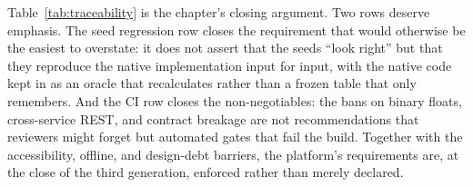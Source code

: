 Table~\ref{tab:traceability} is the chapter's closing argument. Two rows deserve emphasis. The seed
regression row closes the requirement that would otherwise be the easiest to overstate: it does not
assert that the seeds \enquote{look right} but that they reproduce the native implementation input
for input, with the native code kept in  as an oracle that recalculates rather
than a frozen table that only remembers. And the CI row closes the non-negotiables: the bans on
binary floats, cross-service REST, and contract breakage are not recommendations that reviewers
might forget but automated gates that fail the build. Together with the accessibility, offline, and
design-debt barriers, the platform's requirements are, at the close of the third generation,
enforced rather than merely declared.
